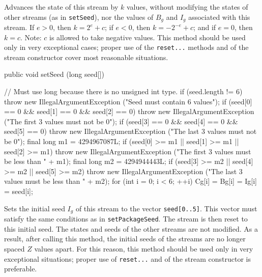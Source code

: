  \begin{tabb} Advances the state of this stream by $k$ values,
  without modifying the states of other streams (as in \texttt{setSeed}),
  nor the values of $B_g$ and $I_g$ associated with this stream.
  If $e > 0$, then $k=2^e + c$; 
  if $e < 0$,  then $k=-2^{-e} + c$; and if $e = 0$,  then $k=c$.
  Note: $c$ is allowed to take negative values.
  This method should be used only in very 
  exceptional cases; proper use of the \texttt{reset...} methods 
  and of the stream constructor cover most reasonable situations.
 \end{tabb}
\begin{htmlonly}
\end{htmlonly}
\begin{code}

   public void setSeed (long seed[]) \begin{hide} {
      // Must use long because there is no unsigned int type.
      if (seed.length != 6)
         throw new IllegalArgumentException ("Seed must contain 6 values");
      if (seed[0] == 0 && seed[1] == 0 && seed[2] == 0)
         throw new IllegalArgumentException ("The first 3 values must not be 0");
      if (seed[3] == 0 && seed[4] == 0 && seed[5] == 0)
         throw new IllegalArgumentException ("The last 3 values must not be 0");
      final long m1 = 4294967087L;
      if (seed[0] >= m1 || seed[1] >= m1 || seed[2] >= m1)
         throw new IllegalArgumentException ("The first 3 values must be less than " + m1);
      final long m2 = 4294944443L;
      if (seed[3] >= m2 || seed[4] >= m2 || seed[5] >= m2)
         throw new IllegalArgumentException ("The last 3 values must be less than " + m2);
      for (int i = 0; i < 6;  ++i)
         Cg[i] = Bg[i] = Ig[i] = seed[i];
   }\end{hide}
\end{code}
 \begin{tabb}  Sets the initial seed $I_g$ of this stream 
  to the vector \texttt{seed[0..5]}.  This vector must satisfy the same 
  conditions as in \texttt{setPackageSeed}.
  The stream is then reset to this initial seed.
  The states and seeds of the other streams are not modified.
  As a result, after calling this method, the initial seeds
  of the streams are no longer spaced $Z$ values apart.
  For this reason, this method should be used only in very 
  exceptional situations; proper use of \texttt{reset...} 
  and of the stream constructor is preferable.
 \end{tabb}
